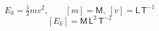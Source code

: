 \[ E_k = \tfrac{1}{2} m v^2, \qquad [m] = \mathsf{M},\ [v] = \mathsf{L}\,\mathsf{T}^{-1} \]
\[ [E_k] = \mathsf{M}\,\mathsf{L}^{2}\,\mathsf{T}^{-2} \]
